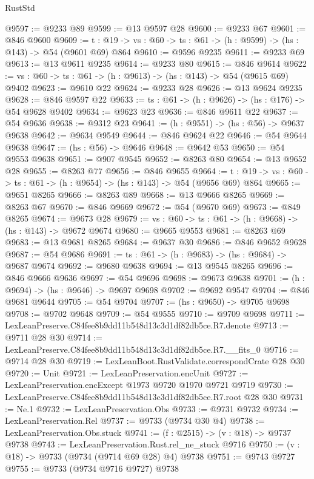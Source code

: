 \begin{lexlean}{RustStd}
\begin{coremodule}
@9597 := @9233 @89
@9599 := @13 @9597 @28
@9600 := @9233 @67
@9601 := @846 @9600
@9609 := {t : @19} -> {vs : @60} -> {ts : @61} -> (h : @9599) -> (hs : @143) -> @54 (@9601 @69) @864
@9610 := @9596 @9235
@9611 := @9233 @69
@9613 := @13 @9611 @9235
@9614 := @9233 @80
@9615 := @846 @9614
@9622 := {vs : @60} -> {ts : @61} -> (h : @9613) -> (hs : @143) -> @54 (@9615 @69) @9402
@9623 := @9610 @22
@9624 := @9233 @28
@9626 := @13 @9624 @9235
@9628 := @846 @9597 @22
@9633 := {ts : @61} -> (h : @9626) -> (hs : @176) -> @54 @9628 @9402
@9634 := @9623 @23
@9636 := @846 @9611 @22
@9637 := @54 @9636
@9638 := @9312 @23
@9641 := (h : @9551) -> (hs : @56) -> @9637 @9638
@9642 := @9634 @9549
@9644 := @846 @9624 @22
@9646 := @54 @9644 @9638
@9647 := (hs : @56) -> @9646
@9648 := @9642 @53
@9650 := @54 @9553 @9638
@9651 := @907 @9545
@9652 := @8263 @80
@9654 := @13 @9652 @28
@9655 := @8263 @77
@9656 := @846 @9655
@9664 := {t : @19} -> {vs : @60} -> {ts : @61} -> (h : @9654) -> (hs : @143) -> @54 (@9656 @69) @864
@9665 := @9651 @8265
@9666 := @8263 @89
@9668 := @13 @9666 @8265
@9669 := @8263 @67
@9670 := @846 @9669
@9672 := @54 (@9670 @69)
@9673 := @849 @8265
@9674 := @9673 @28
@9679 := {vs : @60} -> {ts : @61} -> (h : @9668) -> (hs : @143) -> @9672 @9674
@9680 := @9665 @9553
@9681 := @8263 @69
@9683 := @13 @9681 @8265
@9684 := @9637 @30
@9686 := @846 @9652 @9628
@9687 := @54 @9686
@9691 := {ts : @61} -> (h : @9683) -> (hs : @9684) -> @9687 @9674
@9692 := @9680 @9638
@9694 := @13 @9545 @8265
@9696 := @846 @9666 @9636
@9697 := @54 @9696
@9698 := @9673 @9638
@9701 := (h : @9694) -> (hs : @9646) -> @9697 @9698
@9702 := @9692 @9547
@9704 := @846 @9681 @9644
@9705 := @54 @9704
@9707 := (hs : @9650) -> @9705 @9698
@9708 := @9702 @9648
@9709 := @54 @9555
@9710 := @9709 @9698
@9711 := LexLeanPreserve.C84fee8b9dd11b548d13c3d1df82db5ce.R7.denote
@9713 := @9711 @28 @30
@9714 := LexLeanPreserve.C84fee8b9dd11b548d13c3d1df82db5ce.R7.__fits_0
@9716 := @9714 @28 @30
@9719 := LexLeanBoot.RustValidate.correspondCrate @28 @30
@9720 := Unit
@9721 := LexLeanPreservation.encUnit
@9727 := LexLeanPreservation.encExcept @1973 @9720 @1970 @9721 @9719
@9730 := LexLeanPreserve.C84fee8b9dd11b548d13c3d1df82db5ce.R7.root @28 @30
@9731 := Ne.{1}
@9732 := LexLeanPreservation.Obs
@9733 := @9731 @9732
@9734 := LexLeanPreservation.Rel
@9737 := @9733 (@9734 @30 @4)
@9738 := LexLeanPreservation.Obs.stuck
@9741 := (f : @2515) -> (v : @18) -> @9737 @9738
@9743 := LexLeanPreservation.Rust.rel_ne_stuck @9716
@9750 := (v : @18) -> @9733 (@9734 (@9714 @69 @28) @4) @9738
@9751 := @9743 @9727
@9755 := @9733 (@9734 @9716 @9727) @9738

\end{coremodule}
\end{lexlean}
